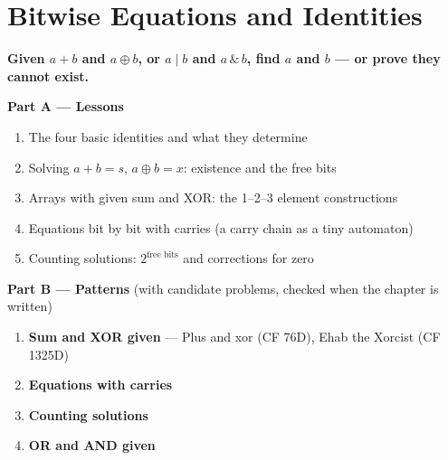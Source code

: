 \chapter{Bitwise Equations and Identities}
\label{ch:equations}

\begin{tcolorbox}[enhanced, colback=white, colframe=secondaryblue, boxrule=1pt, arc=2mm]
\textbf{\large\textcolor{primaryblue}{Given $a + b$ and $a \oplus b$, or $a \mid b$ and $a \,\&\, b$, find $a$ and $b$ --- or prove they cannot exist.}}
\end{tcolorbox}


\begin{plannedbox}
\textbf{Part A --- Lessons}
\begin{enumerate}[leftmargin=*, label=\textbf{A\arabic*.}, itemsep=1pt]
    \item The four basic identities and what they determine
    \item Solving $a + b = s$, $a \oplus b = x$: existence and the free bits
    \item Arrays with given sum and XOR: the 1--2--3 element constructions
    \item Equations bit by bit with carries (a carry chain as a tiny automaton)
    \item Counting solutions: $2^{\text{free bits}}$ and corrections for zero
\end{enumerate}
\textbf{Part B --- Patterns} (with candidate problems, checked when the chapter is written)
\begin{enumerate}[leftmargin=*, label=\textbf{P\arabic*.}, itemsep=1pt]
    \item \textbf{Sum and XOR given} --- Plus and xor {\small\color{darkgray}(CF 76D)}, Ehab the Xorcist {\small\color{darkgray}(CF 1325D)}
    \item \textbf{Equations with carries}
    \item \textbf{Counting solutions}
    \item \textbf{OR and AND given}
\end{enumerate}
\end{plannedbox}
